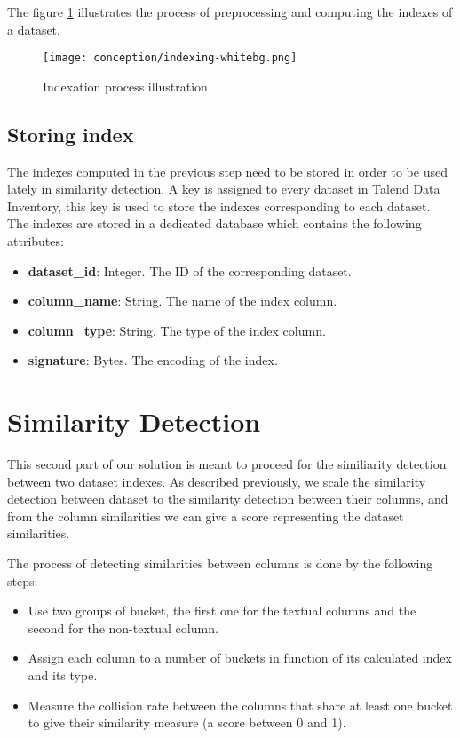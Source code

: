The figure \ref{fig:indexation_process} illustrates the process of preprocessing
and computing the indexes of a dataset.

\begin{figure}[h]
    \centering
    \texttt{[image: conception/indexing-whitebg.png]}
    \caption{Indexation process illustration}
    \label{fig:indexation_process}
\end{figure}

\subsection{Storing index}
The indexes computed in the previous step need to be stored in order to be used
lately in similarity detection. A key is assigned to every dataset in Talend
Data Inventory, this key is used to store the indexes corresponding to each
dataset. The indexes are stored in a dedicated database which contains the
following attributes:

\begin{itemize}
    \item \textbf{dataset\_id}: Integer. The ID of the corresponding dataset.
    \item \textbf{column\_name}: String. The name of the index column.
    \item \textbf{column\_type}: String. The type of the index column.
    \item \textbf{signature}: Bytes. The encoding of the index.
\end{itemize}


\section{Similarity Detection}
This second part of our solution is meant to proceed for the similiarity
detection between two dataset indexes. As described previously, we scale the
similarity detection between dataset to the similarity detection between their
columns, and from the column similarities we can give a score representing the
dataset similarities. 

The process of detecting similarities between columns is
done by the following steps:

\begin{itemize}
    \item Use two groups of bucket, the first one for the textual columns and
    the second for the non-textual column.
    \item Assign each column to a number of buckets in function of its
     calculated index and its type.
    \item Measure the collision rate between the columns that share at least one
    bucket to give their similarity measure (a score between 0 and 1).
\end{itemize}

